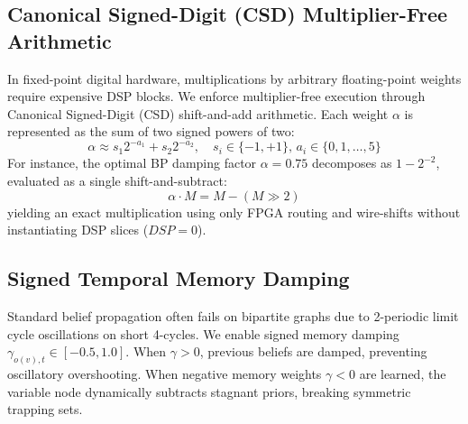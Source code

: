 \documentclass[journal]{IEEEtran}
\begin{document}
\subsection{Canonical Signed-Digit (CSD) Multiplier-Free Arithmetic}
In fixed-point digital hardware, multiplications by arbitrary floating-point weights require expensive DSP blocks. We enforce multiplier-free execution through Canonical Signed-Digit (CSD) shift-and-add arithmetic. Each weight $\alpha$ is represented as the sum of two signed powers of two:
\begin{equation}
    \alpha \approx s_1 2^{-a_1} + s_2 2^{-a_2}, \quad s_i \in \{-1, +1\}, \, a_i \in \{0, 1, \dots, 5\}
\end{equation}
For instance, the optimal BP damping factor $\alpha = 0.75$ decomposes as $1 - 2^{-2}$, evaluated as a single shift-and-subtract:
\begin{equation}
    \alpha \cdot M = M - (M \gg 2)
\end{equation}
yielding an exact multiplication using only FPGA routing and wire-shifts without instantiating DSP slices ($DSP=0$).

\subsection{Signed Temporal Memory Damping}
Standard belief propagation often fails on bipartite graphs due to 2-periodic limit cycle oscillations on short 4-cycles. We enable signed memory damping $\gamma_{o(v), t} \in [-0.5, 1.0]$. When $\gamma > 0$, previous beliefs are damped, preventing oscillatory overshooting. When negative memory weights $\gamma < 0$ are learned, the variable node dynamically subtracts stagnant priors, breaking symmetric trapping sets.
\end{document}
